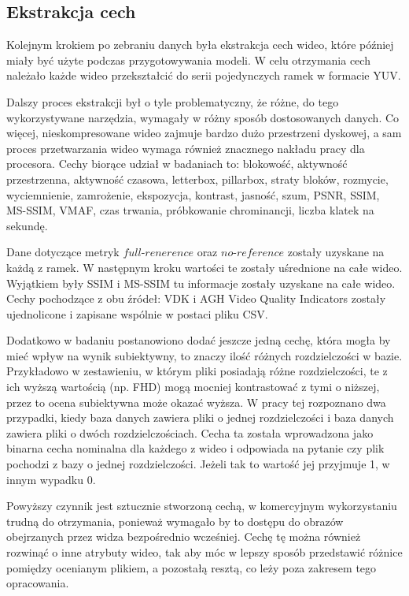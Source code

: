 \subsection{Ekstrakcja cech}
Kolejnym krokiem po zebraniu danych była ekstrakcja cech wideo, które później miały być użyte podczas przygotowywania modeli. W celu otrzymania cech należało każde wideo przekształcić do serii pojedynczych ramek w formacie YUV. 

Dalszy proces ekstrakcji był o tyle problematyczny, że różne, do tego wykorzystywane narzędzia, wymagały w różny sposób dostosowanych danych. Co więcej, nieskompresowane wideo zajmuje bardzo dużo przestrzeni dyskowej, a sam proces przetwarzania wideo wymaga również znacznego nakładu pracy dla procesora. Cechy biorące udział w badaniach to: blokowość, aktywność przestrzenna, aktywność czasowa, letterbox, pillarbox, straty bloków, rozmycie, wyciemnienie, zamrożenie, ekspozycja, kontrast, jasność, szum, PSNR, SSIM, MS-SSIM, VMAF, czas trwania, próbkowanie chrominancji, liczba klatek na sekundę.\par

Dane dotyczące metryk $full$-$renerence$ oraz $no$-$reference$ zostały uzyskane na każdą z ramek. W następnym kroku wartości te zostały uśrednione na całe wideo. Wyjątkiem były SSIM i MS\--SSIM tu informacje zostały uzyskane na całe wideo. Cechy pochodzące z obu źródeł: VDK i AGH Video Quality Indicators zostały ujednolicone i zapisane wspólnie w postaci pliku CSV.\par

Dodatkowo w badaniu postanowiono dodać jeszcze jedną cechę, która mogła by mieć wpływ na wynik subiektywny, to znaczy ilość różnych rozdzielczości w bazie. Przykładowo w zestawieniu, w którym pliki posiadają różne rozdzielczości, te z ich wyższą wartością (np. FHD) mogą mocniej kontrastować z tymi o niższej, przez to ocena subiektywna może okazać wyższa. W pracy tej rozpoznano dwa przypadki, kiedy baza danych zawiera pliki o jednej rozdzielczości i baza danych zawiera pliki o dwóch rozdzielczościach. Cecha ta została wprowadzona jako binarna cecha nominalna dla każdego z wideo i odpowiada na pytanie czy plik pochodzi z bazy o jednej rozdzielczości. Jeżeli tak to wartość jej przyjmuje 1, w innym wypadku 0.  \par

Powyższy czynnik jest sztucznie stworzoną cechą, w komercyjnym wykorzystaniu trudną do otrzymania, ponieważ wymagało by to dostępu do obrazów obejrzanych przez widza bezpośrednio wcześniej. Cechę tę można również rozwinąć o inne atrybuty wideo, tak aby móc w lepszy sposób przedstawić różnice pomiędzy ocenianym plikiem, a pozostałą resztą, co leży poza zakresem tego opracowania.\par

